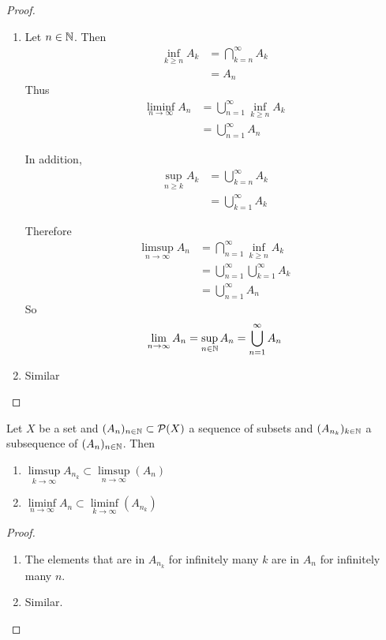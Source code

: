 \documentclass{book}
\begin{document}
	\begin{proof}\
		\begin{enumerate}
			\item Let $n \in \mathbb{N}$. Then 
			\begin{align*}
				\inf\limits_{k \geq n}A_k 
				&= \bigcap\limits_{k=n}^{\infty}A_k \\
				&= A_n
			\end{align*}
			Thus 
			\begin{align*}
				\liminf\limits_{n \rightarrow \infty}A_n 
				&= \bigcup\limits_{n=1}^{\infty} \inf\limits_{k \geq n}A_k \\
				&= \bigcup\limits_{n=1}^{\infty} A_n 
			\end{align*}  
			
			In addition,  
			\begin{align*}
				\sup_{n \geq k} A_k 
				&= \bigcup_{k=n}^{\infty}A_k \\
				&= \bigcup_{k=1}^{\infty}A_k 
			\end{align*}
			
			Therefore 
			\begin{align*}
				\limsup\limits_{n \rightarrow \infty}A_n 
				&= \bigcap\limits_{n=1}^{\infty} \inf\limits_{k \geq n}A_k \\
				&= \bigcup\limits_{n=1}^{\infty} \bigcup_{k=1}^{\infty}A_k  \\
				&= \bigcup_{n=1}^{\infty}A_n
			\end{align*}
			So $$\lim\limits_{n \rightarrow \infty} A_n = \sup_{n \in \mathbb{N}}A_n = \bigcup_{n =1}^{\infty}A_n$$
			
			\item Similar
		\end{enumerate}
	\end{proof}
	
	\begin{ex}  
		Let $X$ be a set and $(A_n)_{n \in \mathbb{N}} \subset \mathcal{P}(X)$ a sequence of subsets and $(A_{n_k})_{k \in \mathbb{N}}$ a subsequence of $(A_n)_{n \in \mathbb{N}}$. Then 
		\begin{enumerate}
			\item $\limsup\limits_{k \rightarrow \infty}A_{n_k} \subset \limsup\limits_{n \rightarrow \infty}(A_{n})$
			\item $\liminf \limits_{n \rightarrow \infty} A_{n} \subset \liminf\limits_{k \rightarrow \infty}(A_{n_k})$
		\end{enumerate}
	\end{ex}
	
	\begin{proof}\
		\begin{enumerate}
			\item The elements that are in $A_{n_k}$ for infinitely many $k$ are in $A_n$ for infinitely many $n$.
			\item Similar.
		\end{enumerate}
	\end{proof}
	
\end{document}
